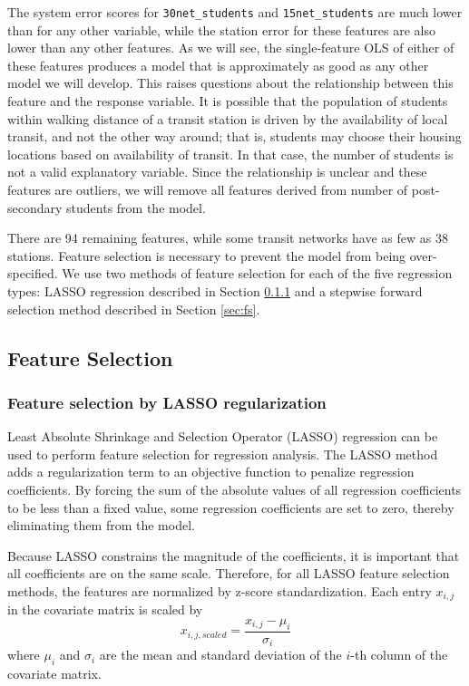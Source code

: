 \documentclass[11pt]{article}
\begin{document}
The system error scores for \texttt{30net\_students} and \texttt{15net\_students} are much lower than for any other variable, while the station error for these features are also lower than any other features. As we will see, the single-feature OLS of either of these features produces a model that is approximately as good as any other model we will develop. This raises questions about the relationship between this feature and the response variable. It is possible that the population of students within walking distance of a transit station is driven by the availability of local transit, and not the other way around; that is, students may choose their housing locations based on availability of transit. In that case, the number of students is not a valid explanatory variable. Since the relationship is unclear and these features are outliers, we will remove all features derived from number of post-secondary students from the model.

There are 94 remaining features, while some transit networks have as few as 38 stations. Feature selection is necessary to prevent the model from being over-specified. We use two methods of feature selection for each of the five regression types: LASSO regression described in Section \ref{sec:lasso} and a stepwise forward selection method described in Section \ref{sec:fs}. 

\subsection{Feature Selection}

\subsubsection{Feature selection by LASSO regularization}\label{sec:lasso}


Least Absolute Shrinkage and Selection Operator (LASSO) regression can be used to perform feature selection for regression analysis. The LASSO method adds a regularization term to an objective function to penalize regression coefficients. By forcing the sum of the absolute values of all regression coefficients to be less than a fixed value, some regression coefficients are set to zero, thereby eliminating them from the model. 

Because LASSO constrains the magnitude of the coefficients, it is important that all coefficients are on the same scale. Therefore, for all LASSO feature selection methods, the features are normalized by z-score standardization. Each entry $x_{i,j}$ in the covariate matrix is scaled by
$$ x_{i, j, scaled} = \frac{x_{i,j} - \mu_i}{\sigma_i}$$ where $\mu_i$ and $\sigma_i$ are the mean and standard deviation of the $i$-th column of the covariate matrix.
\end{document}

